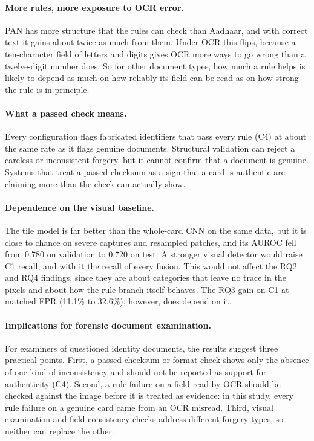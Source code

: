 \documentclass[12pt]{article}
\begin{document}
\paragraph*{More rules, more exposure to OCR error.} PAN has more structure that the rules can check than Aadhaar, and with correct text it gains about twice as much from them. Under OCR this flips, because a ten-character field of letters and digits gives OCR more ways to go wrong than a twelve-digit number does. So for other document types, how much a rule helps is likely to depend as much on how reliably its field can be read as on how strong the rule is in principle.

\paragraph*{What a passed check means.} Every configuration flags fabricated identifiers that pass every rule (C4) at about the same rate as it flags genuine documents. Structural validation can reject a careless or inconsistent forgery, but it cannot confirm that a document is genuine. Systems that treat a passed checksum as a sign that a card is authentic are claiming more than the check can actually show.

\paragraph*{Dependence on the visual baseline.} The tile model is far better than the whole-card CNN on the same data, but it is close to chance on severe captures and resampled patches, and its AUROC fell from 0.780 on validation to 0.720 on test. A stronger visual detector would raise C1 recall, and with it the recall of every fusion. This would not affect the RQ2 and RQ4 findings, since they are about categories that leave no trace in the pixels and about how the rule branch itself behaves. The RQ3 gain on C1 at matched FPR (11.1\% to 32.6\%), however, does depend on it.

\paragraph*{Implications for forensic document examination.} For examiners
of questioned identity documents, the results suggest three practical
points. First, a passed checksum or format check shows only the absence
of one kind of inconsistency and should not be reported as support for
authenticity (C4). Second, a rule failure on a field read by OCR should
be checked against the image before it is treated as evidence: in this
study, every rule failure on a genuine card came from an OCR misread.
Third, visual examination and field-consistency checks address
different forgery types, so neither can replace the other.
\end{document}
